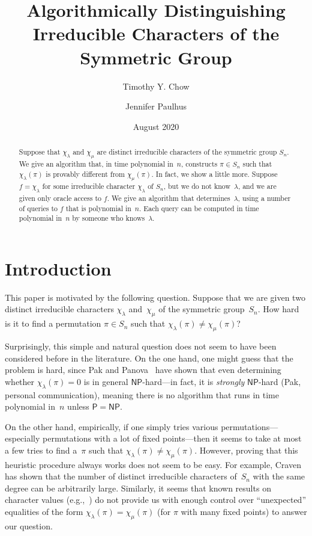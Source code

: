 \documentclass[12pt]{article}
\title{Algorithmically Distinguishing Irreducible Characters of the Symmetric Group}
\author{Timothy Y. Chow \and Jennifer Paulhus}
\date{August 2020}
\theoremstyle{definition}
\begin{document}
\maketitle

\begin{abstract} 
Suppose that $\chi_\lambda$ and $\chi_\mu$ are
distinct irreducible characters of the symmetric group $S_n$.
We give an algorithm that, in time polynomial in~$n$,
constructs $\pi\in S_n$
such that $\chi_\lambda(\pi)$ is provably different from $\chi_\mu(\pi)$.
In fact, we show a little more.
Suppose $f = \chi_\lambda$ for some irreducible character
$\chi_\lambda$ of $S_n$,
but we do not know~$\lambda$,
and we are given only oracle access to $f$.
We give an algorithm that determines~$\lambda$,
using a number of queries to $f$ that is polynomial in~$n$.
Each query can be computed in time polynomial in~$n$
by someone who knows~$\lambda$.
\end{abstract}

\section{Introduction}


This paper is motivated by the following question.
Suppose that we are given
two distinct irreducible characters
$\chi_\lambda$ and~$\chi_\mu$
of the symmetric group~$S_n$.
How hard is it to find a permutation $\pi\in S_n$
such that $\chi_\lambda(\pi) \ne \chi_\mu(\pi)$?

Surprisingly, this simple and natural question does
not seem to have been considered before in the literature.
On the one hand, one might guess that the problem is hard,
since Pak and Panova~\cite[Theorem 7.1]{pak-panova}
have shown that even determining whether
$\chi_\lambda(\pi) = 0$ is in general
$\mathsf{NP}$-hard---in fact,
it is \emph{strongly} $\mathsf{NP}$-hard
(Pak, personal communication),
meaning there is no algorithm that runs in time polynomial in~$n$
unless $\mathsf{P} = \mathsf{NP}$.

On the other hand, empirically,
if one simply tries various permutations---especially
permutations with a lot of fixed points---then
it seems to take at most a few tries to find a~$\pi$
such that $\chi_\lambda(\pi) \ne \chi_\mu(\pi)$.
However, proving that this heuristic procedure always works
does not seem to be easy.
For example, Craven~\cite{craven} has shown that the number of
distinct irreducible characters of~$S_n$ with the same degree
can be arbitrarily large.
Similarly, it seems that
known results on character values (e.g.,~\cite{larsen-shalev})
do not provide us with enough control over
``unexpected'' equalities of the form
$\chi_\lambda(\pi)  = \chi_\mu(\pi)$
(for $\pi$ with many fixed points) to answer our question.
\end{document}
